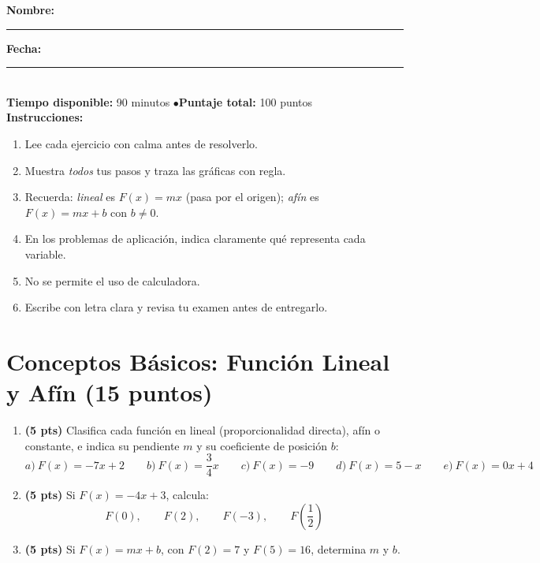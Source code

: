 \documentclass[12pt, letterpaper]{article}
\begin{document}


\vspace{4pt}
\begin{cuadroinfo}
  \small
  \textbf{Nombre:} \rule{0.55\linewidth}{0.4pt} \quad \textbf{Fecha:} \rule{0.15\linewidth}{0.4pt} \\[6pt]
  \textbf{Tiempo disponible:} 90 minutos \quad$\bullet$\quad \textbf{Puntaje total:} 100 puntos \\[4pt]
  \textbf{Instrucciones:}
  \begin{enumerate}[leftmargin=*]
    \item Lee cada ejercicio con calma antes de resolverlo.
    \item Muestra \emph{todos} tus pasos y traza las gráficas con regla.
    \item Recuerda: \emph{lineal} es $F(x) = mx$ (pasa por el origen); \emph{afín} es $F(x) = mx + b$ con $b \neq 0$.
    \item En los problemas de aplicación, indica claramente qué representa cada variable.
    \item No se permite el uso de calculadora.
    \item Escribe con letra clara y revisa tu examen antes de entregarlo.
  \end{enumerate}
\end{cuadroinfo}

\vspace{8pt}

\section{Conceptos Básicos: Función Lineal y Afín (15 puntos)}

\begin{enumerate}[leftmargin=*]
  \item \textbf{(5 pts)} Clasifica cada función en lineal (proporcionalidad directa), afín o constante, e indica su pendiente $m$ y su coeficiente de posición $b$:
        \[
          a)\ F(x) = -7x + 2 \qquad b)\ F(x) = \frac{3}{4}x \qquad c)\ F(x) = -9 \qquad d)\ F(x) = 5 - x \qquad e)\ F(x) = 0x + 4
        \]

  \item \textbf{(5 pts)} Si $F(x) = -4x + 3$, calcula:
        \[
          F(0), \qquad F(2), \qquad F(-3), \qquad F\!\left(\frac{1}{2}\right)
        \]

  \item \textbf{(5 pts)} Si $F(x) = mx + b$, con $F(2) = 7$ y $F(5) = 16$, determina $m$ y $b$.
\end{enumerate}
\end{document}
